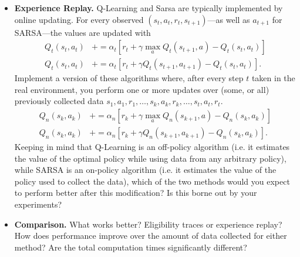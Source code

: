 \documentclass[twoside,a4paper]{article}
\begin{document}
\begin{itemize}
\item \textbf{Experience Replay.} Q-Learning and Sarsa are typically implemented by online updating. For every observed $(s_t,a_t, r_t, s_{t+1})$---as well as $a_{t+1}$ for SARSA---the values are updated with
  \begin{align}
    Q_t(s_t, a_t) &+=  \alpha_t [r_t + \gamma \max_a Q_t(s_{t+1}, a) -  Q_t(s_t, a_t)] \tag{Q-Learning}\\
    Q_t(s_t, a_t) &+=  \alpha_t [r_t + \gamma Q_t(s_{t+1}, a_{t+1}) -  Q_t(s_t, a_t)] \tag{SARSA}.
  \end{align}
  Implement a version of these algorithms where, after every step $t$ taken in the real environment, you perform one or more updates over (some, or all) previously collected data $s_1, a_1, r_1, \ldots, s_k, a_k, r_k, \ldots, s_t, a_t, r_t$.
  \begin{align}
    Q_n(s_k, a_k) &+=  \alpha_n [r_k + \gamma \max_a Q_n(s_{k+1}, a) -  Q_n(s_k, a_k)] \tag{Q-Learning}\\
    Q_n(s_k, a_k) &+=  \alpha_n [r_k + \gamma Q_n(s_{k+1}, a_{k+1}) -  Q_n(s_k, a_k)] \tag{SARSA}.
  \end{align}
  Keeping in mind that Q-Learning is an off-policy algorithm (i.e. it estimates the value of the optimal policy while using data from any arbitrary policy), while SARSA is an on-policy algorithm (i.e. it estimates the value of the policy used to collect the data), which of the two methods would you expect to perform better after this modification? Is this borne out by your experiments?

\item \textbf{Comparison.} What works better? Eligibility traces or experience replay? How does performance improve over the amount of data collected for either method? Are the total computation times significantly different?
\end{itemize}
\end{document}
